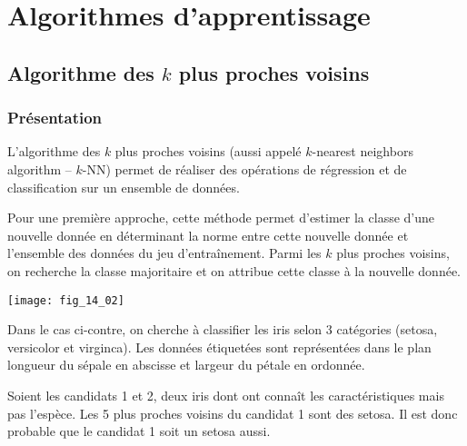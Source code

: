 {%








\section{Algorithmes d'apprentissage}

\subsection{Algorithme des $k$ plus proches voisins}
\subsubsection{Présentation}
L'algorithme des  $k$ plus proches voisins (aussi appelé $k$-nearest neighbors algorithm -- $k$-NN) permet de réaliser des opérations de régression et de classification sur un ensemble de données. 

Pour une première approche, cette méthode permet d'estimer la classe d'une nouvelle donnée en déterminant la norme entre cette nouvelle donnée et l'ensemble des données du jeu d’entraînement. Parmi les $k$ plus proches voisins, on recherche la classe majoritaire et on attribue cette classe à la nouvelle donnée.  



\begin{marginfigure}
\texttt{[image: fig\_14\_02]}
\end{marginfigure}
\begin{exemple}
Dans le cas ci-contre, on cherche à classifier les iris selon 3 catégories (setosa, versicolor et virginca). Les données étiquetées sont représentées dans le plan longueur du sépale en abscisse et largeur du pétale en ordonnée. 

Soient les candidats 1 et 2, deux iris dont ont connaît les caractéristiques mais pas l'espèce. Les 5 plus proches voisins du candidat 1 sont des setosa. Il est donc probable que le candidat 1 soit un setosa aussi.


\end{exemple}}
